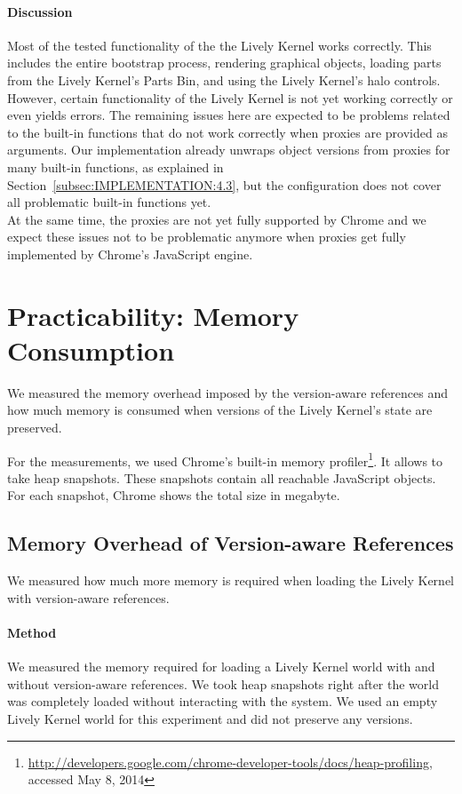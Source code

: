\paragraph{Discussion}
Most of the tested functionality of the the Lively Kernel works correctly.
This includes the entire bootstrap process, rendering graphical objects, loading parts from the Lively Kernel's Parts Bin, and using the Lively Kernel's halo controls.
However, certain functionality of the Lively Kernel is not yet working correctly or even yields errors.
The remaining issues here are expected to be problems related to the built-in functions that do not work correctly when proxies are provided as arguments.
Our implementation already unwraps object versions from proxies for many built-in functions, as explained in Section~\ref{subsec:IMPLEMENTATION:4.3}, but the configuration does not cover all problematic built-in functions yet.\\
At the same time, the proxies are not yet fully supported by Chrome and we expect these issues not to be problematic anymore when proxies get fully implemented by Chrome's JavaScript engine.\\



\section{Practicability: Memory Consumption} \label{sec:EVALUATION:3}

We measured the memory overhead imposed by the version-aware references and how much memory is consumed when versions of the Lively Kernel's state are preserved.

For the measurements, we used Chrome's built-in memory profiler\footnote{\url{http://developers.google.com/chrome-developer-tools/docs/heap-profiling}, accessed May 8, 2014}.
It allows to take heap snapshots.
These snapshots contain all reachable JavaScript objects.
For each snapshot, Chrome shows the total size in megabyte.

\subsection{Memory Overhead of Version-aware References}

We measured how much more memory is required when loading the Lively Kernel with version-aware references.

\paragraph{Method}
We measured the memory required for loading a Lively Kernel world with and without version-aware references.
We took heap snapshots right after the world was completely loaded without interacting with the system.
We used an empty Lively Kernel world for this experiment and did not preserve any versions.

